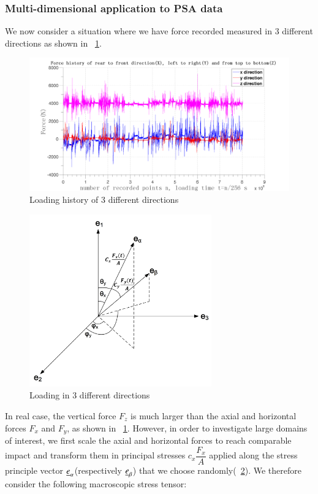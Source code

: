 \documentclass[3p,times,procedia,number]{elsarticle}
\newcommand{\figref}[1]{\figurename~\ref{#1}}
\begin{document}
\newpage
\subsubsection{Multi-dimensional application to PSA data}
We now consider a situation where we have force recorded measured in 3 different directions as shown in \figref{xyz}.
\begin{figure}[!h]
	\centering
	\includegraphics[width=\textwidth]{figures//xyz.png} 
	\caption{Loading history of 3 different directions}
	\label{xyz}
\end{figure}
\begin{figure}[!h]
	\centering
	\includegraphics[width=0.7\textwidth]{figures//xab.png} 
	\caption{Loading in 3 different directions}
	\label{xab}
\end{figure}
In real case, the vertical force $F_z$ is much larger than the axial and horizontal forces $F_x$ and $F_y$, as shown in \figref{xyz}. However, in order to investigate large domains of interest, we first scale the axial and horizontal forces to reach comparable impact and transform them in principal stresses $c_x\dfrac{F_x}{A}$ applied along the stress principle vector $\uline{e}_\alpha$(respectively $\uline{e}_\beta$) that we choose randomly(\figref{xab}). We therefore consider the following macroscopic stress tensor:
\end{document}
